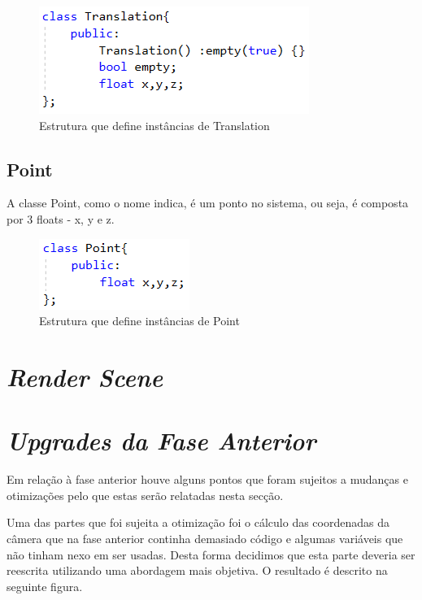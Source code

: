 \documentclass[a4paper]{article}
\begin{document}
\begin{figure}[H]
\centering
\includegraphics[scale=0.8]{translation.png}
\caption{Estrutura que define instâncias de Translation}
\label{img:Tree}
\end{figure}


\subsection{Point}
\label{sec:point}

A classe Point, como o nome indica, é um ponto no sistema, ou seja, é composta por 3 floats - x, y e z.

\begin{figure}[H]
\centering
\includegraphics[scale=0.8]{point.png}
\caption{Estrutura que define instâncias de Point}
\label{img:Point}
\end{figure}


\newpage

\section{\textit{Render Scene}}

\newpage

\section{\textit{Upgrades da Fase Anterior}}

Em relação à fase anterior houve alguns pontos que foram sujeitos a mudanças e otimizações pelo que estas serão relatadas nesta secção.

Uma das partes que foi sujeita a otimização foi o cálculo das coordenadas da câmera que na fase anterior continha demasiado código e algumas variáveis que não tinham nexo em ser usadas.
Desta forma decidimos que esta parte deveria ser reescrita utilizando uma abordagem mais objetiva. O resultado é descrito na seguinte figura.
\end{document}
